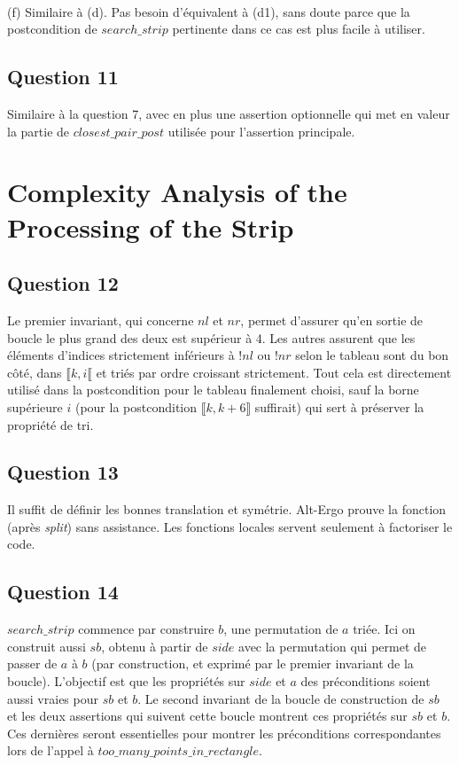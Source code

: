 \documentclass[11pt, openany, titlepage]{article}
\begin{document}
\

(f) Similaire à (d). Pas besoin d'équivalent à (d1), sans doute parce que la postcondition de $search\_strip$ pertinente dans ce cas est plus facile à utiliser.


\subsection{Question 11}

Similaire à la question 7, avec en plus une assertion optionnelle qui met en valeur la partie de $closest\_pair\_post$ utilisée pour l'assertion principale.



\section{Complexity Analysis of the Processing of the Strip}

\subsection{Question 12}

Le premier invariant, qui concerne $nl$ et $nr$, permet d'assurer qu'en sortie de boucle le plus grand des deux est supérieur à 4. Les autres assurent que les éléments d'indices strictement inférieurs à $!nl$ ou $!nr$ selon le tableau sont du bon côté, dans $\llbracket k,i\llbracket$ et triés par ordre croissant strictement. Tout cela est directement utilisé dans la postcondition pour le tableau finalement choisi, sauf la borne supérieure $i$ (pour la postcondition $\llbracket k,k+6\rrbracket$ suffirait) qui sert à préserver la propriété de tri.


\subsection{Question 13}

Il suffit de définir les bonnes translation et symétrie. Alt-Ergo prouve la fonction (après \emph{split}) sans assistance. Les fonctions locales servent seulement à factoriser le code.


\subsection{Question 14}

$search\_strip$ commence par construire $b$, une permutation de $a$ triée. Ici on construit aussi $sb$, obtenu à partir de $side$ avec la permutation qui permet de passer de $a$ à $b$ (par construction, et exprimé par le premier invariant de la boucle). L'objectif est que les propriétés sur $side$ et $a$ des préconditions soient aussi vraies pour $sb$ et $b$. Le second invariant de la boucle de construction de $sb$ et les deux assertions qui suivent cette boucle montrent ces propriétés sur $sb$ et $b$. Ces dernières seront essentielles pour montrer les préconditions correspondantes lors de l'appel à $too\_many\_points\_in\_rectangle$.
\end{document}

